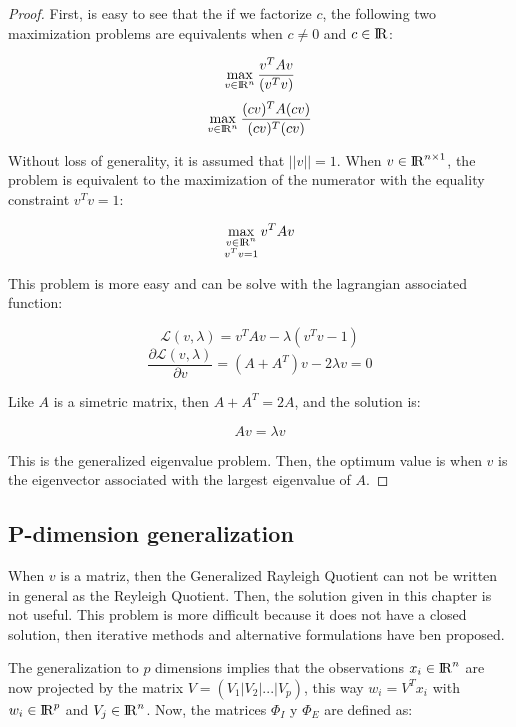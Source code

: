 \begin{proof}
First, is easy to see that the if we factorize $c$, the following two maximization problems are equivalents when $c \neq 0$ and $c \in {\rm I\!R}$: 

$$\max_{v \in {\rm I\!R}^{n} } \frac{v^T A v}{(v^T v)} $$
$$\max_{v \in {\rm I\!R}^{n} } \frac{(cv)^T A (cv)}{(cv)^T(cv)} $$

Without loss of generality, it is assumed that $||v|| = 1$. When $v \in {\rm I\!R}^{n \times 1}$, the problem is equivalent to the maximization of the numerator with the equality constraint $v^T v = 1$:

$$\max_{\substack{v \in {\rm I\!R}^{n}\\ v^T v = 1 }} v^T A v $$

This problem is more easy and can be solve with the lagrangian associated function:

$$\mathcal{L}(v, \lambda) = v^T A v - \lambda(v^T v -1)$$
$$\frac{\partial \mathcal{L}(v, \lambda)}{\partial v} = (A + A^T) v - 2\lambda v = 0$$

Like $A$ is a simetric matrix, then $A + A^T = 2A$, and the solution is:

\begin{equation}\label{eq:2.14}
A v = \lambda v  
\end{equation}

This is the generalized eigenvalue problem. Then, the optimum value is when $v$ is the eigenvector associated with the largest eigenvalue of $A$.

\end{proof}


\subsection{P-dimension generalization}

When $v$ is a matriz, then the Generalized Rayleigh Quotient can not be written in general as the Reyleigh Quotient. Then, the solution given in this chapter is not useful. This problem is more difficult because it does not have a closed solution, then iterative methods and alternative formulations have ben proposed.

The generalization to $p$ dimensions implies that the observations $x_i \in {\rm I\!R}^{n}$ are now projected by the matrix $V = (V_1 | V_2 | ... |V_p)$, this way $w_i = V^T x_i$ with $w_i \in {\rm I\!R}^{p}$ and $V_j \in {\rm I\!R}^{n}$. Now, the matrices $\Phi_I$ y $\Phi_E$ are defined as:

